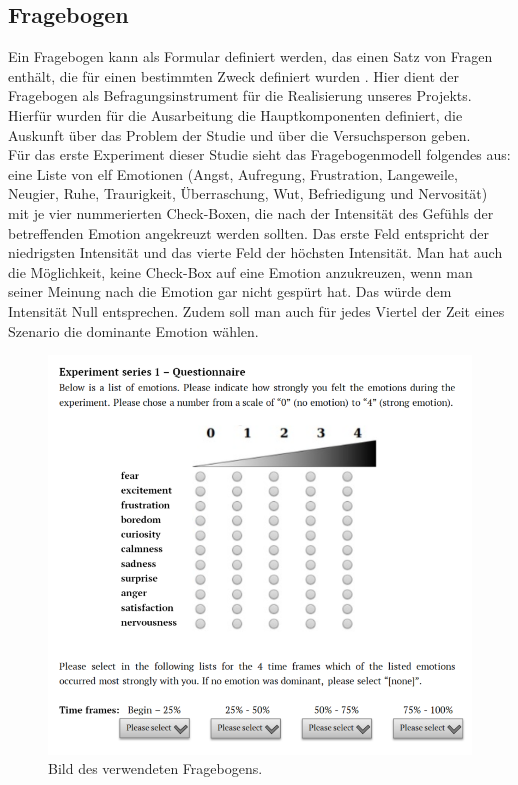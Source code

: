 \subsection{Fragebogen} \label{fragebogen-1}


Ein Fragebogen kann als Formular definiert werden, das einen Satz von Fragen enthält, die für einen bestimmten Zweck definiert wurden \cite{gault-questionnaire}.
Hier dient der Fragebogen als Befragungsinstrument für die Realisierung unseres Projekts. 
Hierfür wurden fü­r die Ausarbeitung die Hauptkomponenten definiert, die Auskunft über das Problem der Studie und über die Versuchsperson geben. \\

Für das erste Experiment dieser Studie sieht das Fragebogenmodell folgendes aus: eine Liste von elf Emotionen (Angst, Aufregung, Frustration, Langeweile, Neugier, Ruhe, Traurigkeit, Überraschung, Wut, Befriedigung und Nervosität) mit je vier nummerierten  Check-Boxen, die nach der Intensität des Gefühls der betreffenden Emotion angekreuzt werden sollten. 
Das erste Feld entspricht der niedrigsten Intensität und das vierte Feld der höchsten Intensität. Man hat auch die Möglichkeit, keine Check-Box auf eine Emotion anzukreuzen, wenn man seiner Meinung nach die Emotion gar nicht gespürt hat. 
Das würde dem Intensität Null entsprechen. Zudem soll man auch für jedes Viertel der Zeit eines Szenario die dominante Emotion wählen. \\


\begin{figure}[H] \centering
\includegraphics[width=\textwidth]{Images/questionnaire-1.png} 
\vspace{-0.3cm} 
\caption{Bild des verwendeten Fragebogens.}
\label{fig-questionare-1} 
\end{figure}

